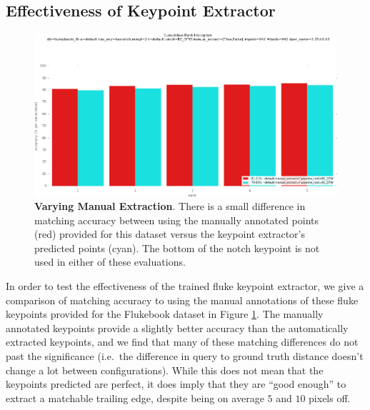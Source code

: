 \subsection{Effectiveness of Keypoint Extractor}
\begin{figure}[t]%
\centering
\includegraphics[width=1\textwidth]{../images/results/vary_manual_extract.png}
\caption{\textbf{Varying Manual Extraction}. There is a small difference in matching accuracy between using the manually annotated points (red) provided for this dataset versus the keypoint extractor's predicted points (cyan). The bottom of the notch keypoint is not used in either of these evaluations.}
\label{fig:vary_manual_extract}
\end{figure}

In order to test the effectiveness of the trained fluke keypoint extractor, we give a comparison of matching accuracy to using the manual annotations of these fluke keypoints provided for the Flukebook dataset in Figure \ref{fig:vary_manual_extract}.
The manually annotated keypoints provide a slightly better accuracy than the automatically extracted keypoints, and we find that many of these matching differences do not past the significance (i.e.\ the difference in query to ground truth distance doesn't change a lot between configurations).
While this does not mean that the keypoints predicted are perfect, it does imply that they are ``good enough'' to extract a matchable trailing edge, despite being on average $5$ and $10$ pixels off.



